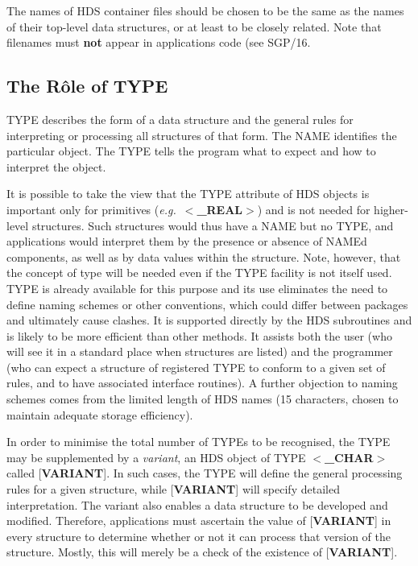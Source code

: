 \documentclass[twoside,11pt]{article}
\newcommand{\xref}[3]{#1}
\newcommand{\xlabel}[1]{}
\begin{document}
The names of HDS container files should be chosen to be the
same as the names of their top-level data structures, or at
least to be closely related.  Note that filenames must {\bf not}
appear in applications code (see \xref{SGP/16}{sgp16}).

\subsection{\xlabel{se_roleoftype}The R\^{o}le of TYPE\label{se:roleoftype}}

TYPE describes the form of a data structure and the general rules
for interpreting or processing all structures of that form.  The NAME
identifies the particular object.  The TYPE tells the program what to 
expect and how to interpret the object.

It is possible to take the view that the TYPE attribute
of HDS objects is important only for
primitives ({\it e.g.}\  $<${\bf \_REAL}$>$) and is not needed for
higher-level structures.
Such structures would thus have a NAME but no TYPE, and applications
would interpret them by the presence or absence of NAMEd components, as
well as by data values within the structure.
Note, however, that the concept of type will be needed even if the
TYPE facility is not itself used.
TYPE is already available for this purpose and its use eliminates
the need to define naming schemes or other conventions, which could
differ between packages and ultimately cause clashes.  It is supported
directly by the HDS subroutines and is likely to be more efficient than
other methods.  It assists both the user (who will see it in a standard
place when structures are listed) and the programmer (who can expect a
structure of registered TYPE to conform to a given set of rules,
and to have associated interface routines).  A
further objection to naming schemes comes from the limited length of HDS
names (15 characters, chosen to maintain adequate storage efficiency). 

In order to minimise the total number of TYPEs to be recognised, 
the TYPE may be supplemented by
a {\it variant}, an HDS object
of TYPE $<${\bf \_CHAR}$>$
called [{\bf VARIANT}{]}.  In such cases,
the TYPE will define the general processing rules for a given
structure, while
{[}{\bf VARIANT}{]}
will specify detailed interpretation.  The variant also enables a data
structure to be developed and modified.  Therefore, applications must
ascertain the value of {[}{\bf VARIANT}{]} in every structure to
determine whether or not it can process that version of the structure. 
Mostly, this will merely be a check of the existence of {[}{\bf VARIANT}{]}.
\end{document}
